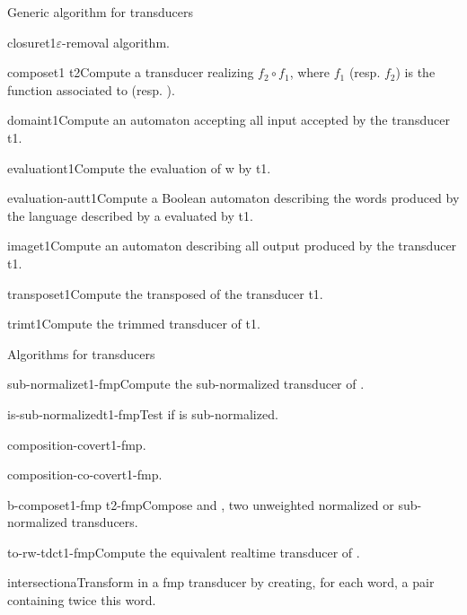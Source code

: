 \begin{fnsection}{Generic algorithm for transducers}
\item{closure}{t1}{$\varepsilon$-removal algorithm.}

\item{compose}{t1 t2}{Compute a transducer realizing $f_2 \circ f_1$,
    where $f_1$ (resp. $f_2$) is the function associated to 
    (resp. ).}

\item{domain}{t1}{Compute an automaton accepting all input accepted by
    the transducer t1.}

\item{evaluation}{t1}{Compute the evaluation of w by t1.}

\item{evaluation-aut}{t1}{Compute a Boolean automaton describing the
    words produced by the language described by a evaluated by t1.}

\item{image}{t1}{Compute an automaton describing all output produced
    by the transducer t1.}

\item{transpose}{t1}{Compute the transposed of the transducer t1.}

\item{trim}{t1}{Compute the trimmed transducer of t1.}  \hline
\end{fnsection}

\begin{fnsection}{Algorithms for transducers}
\item{sub-normalize}{t1-fmp}{Compute the sub-normalized transducer of
    .}
\item{is-sub-normalized}{t1-fmp}{Test if  is
    sub-normalized.}
\item{composition-cover}{t1-fmp}{.}%
\item{composition-co-cover}{t1-fmp}{.}%
\item{b-compose}{t1-fmp t2-fmp}{Compose  and
    , two unweighted normalized or sub-normalized
    transducers.}
\item{to-rw-tdc}{t1-fmp}{Compute the equivalent realtime transducer
    of .}
\item{intersection}{a}{Transform  in a fmp transducer by
    creating, for each word, a pair containing twice this word.}
  \hline
\end{fnsection}


